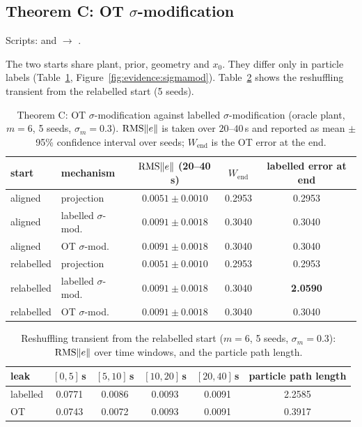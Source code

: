\subsection{Theorem C: OT \texorpdfstring{$\sigma$}{sigma}-modification}

Scripts:  and  $\to$ .

The two starts share plant, prior, geometry and $x_0$. They differ only in particle labels
(Table~\ref{tab:evidence:sigmamod}, Figure~\ref{fig:evidence:sigmamod}). Table~\ref{tab:evidence:transient} shows
the reshuffling transient from the relabelled start (5 seeds).

\begin{table}[htbp]
\centering
\small
\caption{Theorem C: OT $\sigma$-modification against labelled $\sigma$-modification (oracle plant, $m=6$, 5 seeds,
$\sigma_m=0.3$). $\operatorname{RMS}\lVert e\rVert$ is taken over $20$--$40$\,s and reported as mean $\pm$ 95\% confidence interval over seeds;
$W_{\mathrm{end}}$ is the OT error at the end.}
\label{tab:evidence:sigmamod}
\begin{tabular}{@{}llccc@{}}
\toprule
start & mechanism & $\operatorname{RMS}\lVert e\rVert$ (20--40\,s) & $W_{\mathrm{end}}$ & labelled error at end\\
\midrule
aligned    & projection                 & $0.0051\pm0.0010$ & 0.2953 & 0.2953\\
aligned    & labelled $\sigma$-mod.     & $0.0091\pm0.0018$ & 0.3040 & 0.3040\\
aligned    & OT $\sigma$-mod.           & $0.0091\pm0.0018$ & 0.3040 & 0.3040\\
relabelled & projection                 & $0.0051\pm0.0010$ & 0.2953 & 0.2953\\
relabelled & labelled $\sigma$-mod.     & $0.0091\pm0.0018$ & 0.3040 & \textbf{2.0590}\\
relabelled & OT $\sigma$-mod.           & $0.0091\pm0.0018$ & 0.3040 & 0.3040\\
\bottomrule
\end{tabular}
\end{table}

\begin{table}[htbp]
\centering
\small
\caption{Reshuffling transient from the relabelled start ($m=6$, 5 seeds, $\sigma_m=0.3$): $\operatorname{RMS}\lVert e\rVert$ over
time windows, and the particle path length.}
\label{tab:evidence:transient}
\begin{tabular}{@{}lccccc@{}}
\toprule
leak & $[0,5]$\,s & $[5,10]$\,s & $[10,20]$\,s & $[20,40]$\,s & particle path length\\
\midrule
labelled & 0.0771 & 0.0086 & 0.0093 & 0.0091 & 2.2585\\
OT       & 0.0743 & 0.0072 & 0.0093 & 0.0091 & 0.3917\\
\bottomrule
\end{tabular}
\end{table}

